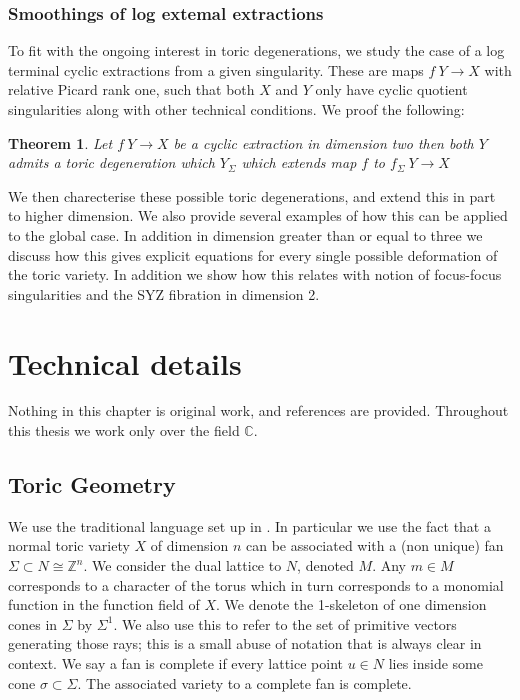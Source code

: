 \documentclass[12pt,a4paper]{book}      %
\newtheorem{thm}{Theorem}[section]
\newcommand{\mb}[1]{\mathbb{#1}}
\begin{document}
\subsection{Smoothings of log extemal extractions}

To fit with the ongoing interest in toric degenerations, we study the case of a log terminal cyclic extractions from a given singularity. These are maps $f \: Y \rightarrow X$ with relative Picard rank one, such that both $X$ and $Y$ only have cyclic quotient singularities along with other technical conditions. We proof the following:

\begin{thm}
Let  $f \: Y \rightarrow X$ be a cyclic extraction in dimension two then both $Y$ admits a toric degeneration which $Y_\Sigma$ which extends map $f$ to $f_\Sigma \: Y \rightarrow X$
\end{thm}
We then charecterise these possible toric degenerations, and extend this in part to higher dimension. We also provide several examples of how this can be applied to the global case. In addition in dimension greater than or equal to three we discuss how this gives explicit equations for every single possible deformation of the toric variety. In addition we show how this relates with notion of focus-focus singularities and the SYZ fibration in dimension 2.


\chapter{Technical details}

Nothing in this chapter is original work, and references are provided. Throughout this thesis we work only over the field $\mb{C}$.
\section{Toric Geometry}

We use the traditional language set up in \cite{cox}. In particular we use the fact that a normal toric variety $X$ of dimension $n$ can be associated with a (non unique) fan $\Sigma \subset N \cong \mb{Z}^n$. We consider the dual lattice to $N$, denoted $M$. Any $m \in M$ corresponds to a character of the torus which in turn corresponds to a monomial function in the function field of $X$. We denote the 1-skeleton of one dimension cones in $\Sigma$ by $\Sigma^1$. We also use this to refer to the set of primitive vectors generating those rays; this is a small abuse of notation that is always clear in context. We say a fan is complete if every lattice point $u \in N$ lies inside some cone $\sigma \subset \Sigma$. The associated variety to a complete fan is complete.
\end{document}
